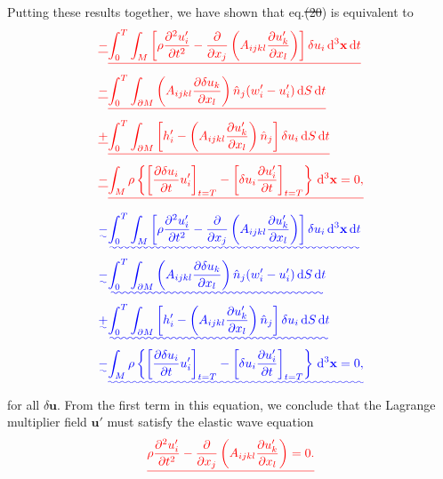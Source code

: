 \documentclass[a4paper,12pt]{paper}
\providecommand{\DIFadd}[1]{{\protect\color{blue}\uwave{#1}}} %
\providecommand{\DIFdel}[1]{{\protect\color{red}\sout{#1}}}                      %
\providecommand{\DIFaddbegin}{} %
\providecommand{\DIFaddend}{} %
\providecommand{\DIFdelbegin}{} %
\providecommand{\DIFdelend}{} %
\begin{document}
Putting these results together, we have shown that eq.\DIFdelbegin \DIFdel{(20}\DIFdelend \DIFaddbegin \DIFadd{~(\ref{eq:20}}\DIFaddend ) is equivalent to
\DIFdelbegin \begin{align*}
\DIFdel{-}&\DIFdel{\int_{0}^{T}\int_{M}\left[\rho\frac{\partial^{2}u_{i}'}{\partial t^{2}}-\frac{\partial}{\partial x_{j}}\left(A_{ijkl}\frac{\partial u_{k}'}{\partial x_{l}}\right)\right]\delta u_{i}\dd^{3}\mathbf{x}\dd t \nonumber }\\
\DIFdel{-}&\DIFdel{\int_{0}^{T}\int_{\partial M}\left(A_{ijkl}\frac{\partial\delta u_{k}}{\partial x_{l}}\right)\hat{n}_{j}(w_{i}'-u_{i}')\dd S\dd t \nonumber }\\
\DIFdel{+}&\DIFdel{\int_{0}^{T}\int_{\partial M}\left[h_{i}'-\left(A_{ijkl}\frac{\partial u_{k}'}{\partial x_{l}}\right)\hat{n}_{j}\right]\delta u_{i}\dd S\dd t \nonumber }\\
\DIFdel{-}&\DIFdel{\int_{M}\rho\left\{\left[\frac{\partial\delta u_{i}}{\partial t}u_{i}'\right]_{t=T}-\left[\delta u_{i}\frac{\partial u_{i}'}{\partial t}\right]_{t=T}\right\}\dd^{3}\mathbf{x}=0,
}\end{align*}%
\DIFdelend \DIFaddbegin \begin{align}
\DIFadd{-}&\DIFadd{\int_{0}^{T}\int_{M}\left[\rho\frac{\partial^{2}u_{i}'}{\partial t^{2}}-\frac{\partial}{\partial x_{j}}\left(A_{ijkl}\frac{\partial u_{k}'}{\partial x_{l}}\right)\right]\delta u_{i}\dd^{3}\mathbf{x}\dd t \nonumber }\\
\DIFadd{-}&\DIFadd{\int_{0}^{T}\int_{\partial M}\left(A_{ijkl}\frac{\partial\delta u_{k}}{\partial x_{l}}\right)\hat{n}_{j}(w_{i}'-u_{i}')\dd S\dd t \nonumber }\\
\DIFadd{+}&\DIFadd{\int_{0}^{T}\int_{\partial M}\left[h_{i}'-\left(A_{ijkl}\frac{\partial u_{k}'}{\partial x_{l}}\right)\hat{n}_{j}\right]\delta u_{i}\dd S\dd t \nonumber }\\
\DIFadd{-}&\DIFadd{\int_{M}\rho\left\{\left[\frac{\partial\delta u_{i}}{\partial t}u_{i}'\right]_{t=T}-\left[\delta u_{i}\frac{\partial u_{i}'}{\partial t}\right]_{t=T}\right\}\dd^{3}\mathbf{x}=0,
\label{eq:25}
}\end{align}\DIFaddend 
for all $\delta \mathbf{u}$. From the first term in this equation, we conclude that the Lagrange 
multiplier field $\mathbf{u}'$ must satisfy the elastic wave equation
\DIFdelbegin \begin{displaymath}
\DIFdel{\rho\frac{\partial^{2}u_{i}'}{\partial t^{2}}-\frac{\partial}{\partial x_{j}}\left(A_{ijkl}\frac{\partial u_{k}'}{\partial x_{l}}\right)=0.
}\end{displaymath}%
\end{document}

